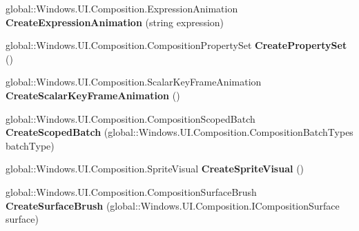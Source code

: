 \begin{DoxyCompactItemize}
\item 
\mbox{\label{interface_windows_1_1_u_i_1_1_composition_1_1_i_compositor_a6edffff7da37deafae21b5d37ae75419}} 
global\+::\+Windows.\+U\+I.\+Composition.\+Expression\+Animation {\bfseries Create\+Expression\+Animation} (string expression)
\item 
\mbox{\label{interface_windows_1_1_u_i_1_1_composition_1_1_i_compositor_a65caaced591df89e953360feef3dc21c}} 
global\+::\+Windows.\+U\+I.\+Composition.\+Composition\+Property\+Set {\bfseries Create\+Property\+Set} ()
\item 
\mbox{\label{interface_windows_1_1_u_i_1_1_composition_1_1_i_compositor_a0fbfc1dc456d3dee8d1faf78bfe40c9a}} 
global\+::\+Windows.\+U\+I.\+Composition.\+Scalar\+Key\+Frame\+Animation {\bfseries Create\+Scalar\+Key\+Frame\+Animation} ()
\item 
\mbox{\label{interface_windows_1_1_u_i_1_1_composition_1_1_i_compositor_ace9715f39dc12e329752515c931e5b77}} 
global\+::\+Windows.\+U\+I.\+Composition.\+Composition\+Scoped\+Batch {\bfseries Create\+Scoped\+Batch} (global\+::\+Windows.\+U\+I.\+Composition.\+Composition\+Batch\+Types batch\+Type)
\item 
\mbox{\label{interface_windows_1_1_u_i_1_1_composition_1_1_i_compositor_adcaefeb1c16a19b1a8bf373e365eab4e}} 
global\+::\+Windows.\+U\+I.\+Composition.\+Sprite\+Visual {\bfseries Create\+Sprite\+Visual} ()
\item 
\mbox{\label{interface_windows_1_1_u_i_1_1_composition_1_1_i_compositor_a9dce8b6100f7776e8c934df2a289924e}} 
global\+::\+Windows.\+U\+I.\+Composition.\+Composition\+Surface\+Brush {\bfseries Create\+Surface\+Brush} (global\+::\+Windows.\+U\+I.\+Composition.\+I\+Composition\+Surface surface)
\item 
\mbox{\label{interface_windows_1_1_u_i_1_1_composition_1_1_i_compositor_a7cda6336654224115f835339f7968fb1}} 

\end{DoxyCompactItemize}
